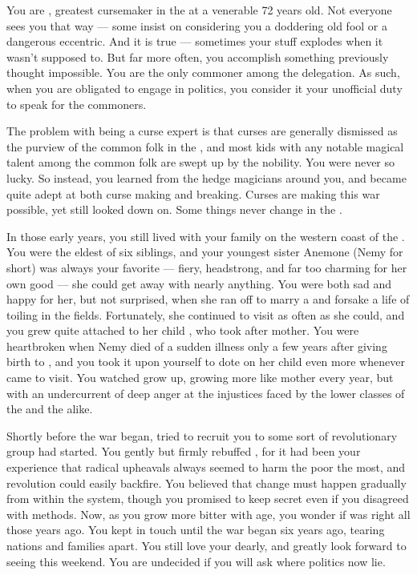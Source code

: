 \documentclass[char]{GL2020}
\begin{document}
\name{\cCurse{}}

You are \cCurse{\intro}, greatest cursemaker in the \pFarm{} at a venerable 72 years old. Not everyone sees you that way — some insist on considering you a doddering old fool or a dangerous eccentric. And it is true — sometimes your stuff explodes when it wasn't supposed to. But far more often, you accomplish something previously thought impossible. You are the only commoner among the \pFarm{} delegation. As such, when you are obligated to engage in politics, you consider it your unofficial duty to speak for the commoners.

The problem with being a curse expert is that curses are generally dismissed as the purview of the common folk in the \pFarm{}, and most kids with any notable magical talent among the common folk are swept up by the nobility. You were never so lucky. So instead, you learned from the hedge magicians around you, and became quite adept at both curse making and breaking. Curses are making this war possible, yet still looked down on. Some things never change in the \pFarm{}.

In those early years, you still lived with your family on the western coast of the \pFarm{}. You were the eldest of six siblings, and your youngest sister Anemone (Nemy for short) was always your favorite — fiery, headstrong, and far too charming for her own good — she could get away with nearly anything. You were both sad and happy for her, but not surprised, when she ran off to marry a \pShippie{} and forsake a life of toiling in the fields. Fortunately, she continued to visit as often as she could, and you grew quite attached to her child \cChupLeader{}, who took after \cChupLeader{\their} mother. You were heartbroken when Nemy died of a sudden illness only a few years after giving birth to \cChupLeader{}, and you took it upon yourself to dote on her child even more whenever \cChupLeader{\they} came to visit. You watched \cChupLeader{\them} grow up, growing more like \cChupLeader{\their} mother every year, but with an undercurrent of deep anger at the injustices faced by the lower classes of the \pFarm{} and the \pShip{} alike. 

Shortly before the war began, \cChupLeader{\they} tried to recruit you to some sort of revolutionary group \cChupLeader{\they} had started. You gently but firmly rebuffed \cChupLeader{\them}, for it had been your experience that radical upheavals always seemed to harm the poor the most, and revolution could easily backfire. You believed that change must happen gradually from within the system, though you promised to keep \cChupLeader{\their} secret even if you disagreed with \cChupLeader{\their} methods. Now, as you grow more bitter with age, you wonder if \cChupLeader{} was right all those years ago. You kept in touch until the war began six years ago, tearing nations and families apart. You still love your \cChupLeader{\nibling} dearly, and greatly look forward to seeing \cChupLeader{\them} this weekend. You are undecided if you will ask where \cChupLeader{\their} politics now lie.
\end{document}
